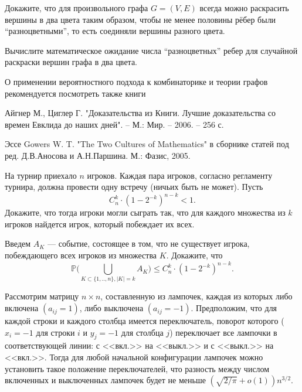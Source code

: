 \begin{problem}  Докажите, что для произвольного графа $G=(V,E)$ всегда можно 
раскрасить вершины в два цвета таким образом, чтобы не менее половины рёбер 
были ``разноцветными'', то есть соединяли вершины разного цвета.
\end{problem}
\begin{ordre}
Вычислите математическое ожидание числа ``разноцветных'' ребер для случайной раскраски вершин графа в два цвета.
\end{ordre}
\begin{remark}
О применении вероятностного подхода к комбинаторике и теории графов рекомендуется посмотреть также книги

Айгнер М., Циглер Г. "Доказательства из Книги. Лучшие доказательства со времен Евклида до наших дней". -- М.: Мир. -- 2006. -- 256 с.

Эссе  Gowers W. T. "The Two Cultures of Mathematics" в сборнике статей под ред. Д.В.Аносова и А.Н.Паршина. М.: Фазис, 2005.
\end{remark}
\begin{comment}
ЛЕНА, К ЭТОЙ ЗАДАЧЕ СТОИТ ДАТЬ УКАЗАНИЕ С ИДЕЕЙ РЕШЕНИЯ из Gowers'a
\end{comment}


\begin{problem}
На турнир приехало $n$ игроков. Каждая пара игроков, согласно регламенту турнира, должна провести одну встречу (ничьих быть не может). Пусть 
$$
C_n^k\cdot (1-2^{-k})^{n-k}<1 . 
$$
Докажите, что тогда игроки могли сыграть так, что для каждого множества из $k$ игроков найдется игрок, который побеждает их всех. 

\end{problem}

\begin{ordre}
Введем $A_K$ --- событие, состоящее в том, что не существует игрока, побеждающего всех игроков из множества $K$. 
Докажите, что 
$$
{\mathbb P}\bigl(\bigcup\limits_{K\subset\{1,..,n\},|K|=k} A_K \bigr)\leqslant C_n^k\cdot (1-2^{-k})^{n-k} . 
$$

\end{ordre}




\begin{problem}
Рассмотрим матрицу $n\times n$, составленную из лампочек, каждая из которых либо включена $(a_{ij}=1)$, либо выключена $(a_{ij}=-1)$. 
Предположим, что для каждой строки и каждого столбца имеется переключатель, поворот которого ($x_i=-1$ для строки $i$ и 
$y_j=-1$ для столбца $j$) переключает все лампочки в соответствующей линии: с <<вкл.>> на <<выкл.>> и с <<выкл.>> на <<вкл.>>. 
Тогда для любой начальной конфигурации лампочек можно установить такое положение переключателей, что разность между числом включенных и 
выключенных лампочек будет не меньше $(\sqrt{2/\pi}+o(1))n^{3/2}$. 
\end{problem}

